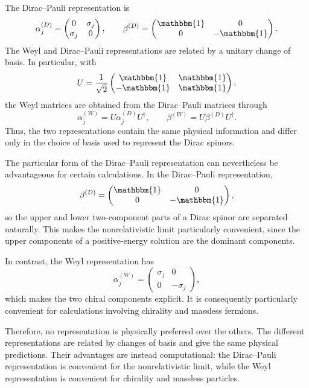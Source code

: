 \documentclass[12pt,a4paper]{article}
\begin{document}
\begin{solution_pset}
		The Dirac--Pauli representation is
		\[
			\alpha_j^{(D)}
			=
			\begin{pmatrix}
				0&\sigma_j\\
				\sigma_j&0
			\end{pmatrix},
			\qquad
			\beta^{(D)}
			=
			\begin{pmatrix}
				\mathbbm{1}&0\\
				0&-\mathbbm{1}
			\end{pmatrix}.
		\]
		The Weyl and Dirac--Pauli representations are related by a unitary change of basis. In particular, with
		\[
			U=
			\frac{1}{\sqrt{2}}
			\begin{pmatrix}
				\mathbbm{1}&\mathbbm{1}\\
				-\mathbbm{1}&\mathbbm{1}
			\end{pmatrix},
		\]
		the Weyl matrices are obtained from the Dirac--Pauli matrices through
		\[
			\alpha_j^{(W)}
			=
			U\alpha_j^{(D)}U^\dagger,
			\qquad
			\beta^{(W)}
			=
			U\beta^{(D)}U^\dagger.
		\]
		Thus, the two representations contain the same physical information and differ only in the choice of basis used to represent the Dirac spinors.

		The particular form of the Dirac--Pauli representation can nevertheless be advantageous for certain calculations. In the Dirac--Pauli representation,
		\[
			\beta^{(D)}
			=
			\begin{pmatrix}
				\mathbbm{1}&0\\
				0&-\mathbbm{1}
			\end{pmatrix},
		\]
		so the upper and lower two-component parts of a Dirac spinor are separated naturally. This makes the nonrelativistic limit particularly convenient, since the upper components of a positive-energy solution are the dominant components.

		In contrast, the Weyl representation has
		\[
			\alpha_j^{(W)}
			=
			\begin{pmatrix}
				\sigma_j&0\\
				0&-\sigma_j
			\end{pmatrix},
		\]
		which makes the two chiral components explicit. It is consequently particularly convenient for calculations involving chirality and massless fermions.

		Therefore, no representation is physically preferred over the others. The different representations are related by changes of basis and give the same physical predictions. Their advantages are instead computational: the Dirac--Pauli representation is convenient for the nonrelativistic limit, while the Weyl representation is convenient for chirality and massless particles.
	\end{solution_pset}
	\newpage
\end{document}
